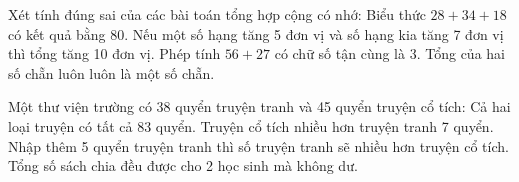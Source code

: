 \begin{ex} %
Xét tính đúng sai của các bài toán tổng hợp cộng có nhớ:
\choiceTF
{\True Biểu thức $28 + 34 + 18$ có kết quả bằng $80$.}
{Nếu một số hạng tăng 5 đơn vị và số hạng kia tăng 7 đơn vị thì tổng tăng 10 đơn vị.}
{\True Phép tính $56 + 27$ có chữ số tận cùng là 3.}
{\True Tổng của hai số chẵn luôn luôn là một số chẵn.}
\end{ex}

\begin{ex} %
Một thư viện trường có 38 quyển truyện tranh và 45 quyển truyện cổ tích:
\choiceTF
{\True Cả hai loại truyện có tất cả 83 quyển.}
{\True Truyện cổ tích nhiều hơn truyện tranh 7 quyển.}
{Nhập thêm 5 quyển truyện tranh thì số truyện tranh sẽ nhiều hơn truyện cổ tích.}
{Tổng số sách chia đều được cho 2 học sinh mà không dư.}
\end{ex}

